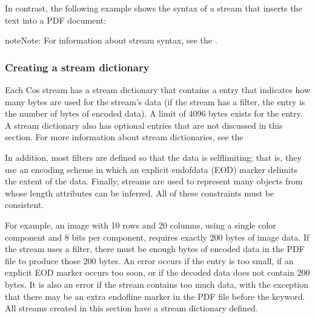 \documentclass[letterpaper,12pt,english,openany,oneside]{sphinxmanual}
\begin{document}
In contrast, the following example shows the syntax of a stream that inserts the text   into a PDF document:

\begin{sphinxVerbatim}[commandchars=\\\{\}]
                      
\end{sphinxVerbatim}

\begin{sphinxadmonition}{note}{Note:}
For information about stream syntax, see the .
\end{sphinxadmonition}


\subsubsection{Creating a stream dictionary}
\label{\detokenize{Plugins_Cos:creating-a-stream-dictionary}}
Each Cos stream has a stream dictionary that contains a  entry that indicates how many bytes are used for the stream’s data (if the stream has a filter, the  entry is the number of bytes of encoded data). A limit of 4096 bytes exists for the  entry. A stream dictionary also has optional entries that are not discussed in this section. For more information about stream dictionaries, see the 

In addition, most filters are defined so that the data is self\sphinxhyphen{}limiting; that is, they use an encoding scheme in which an explicit end\sphinxhyphen{}of\sphinxhyphen{}data (EOD) marker delimits the extent of the data. Finally, streams are used to represent many objects from whose length attributes can be inferred. All of these constraints must be consistent.

For example, an image with 10 rows and 20 columns, using a single color component and 8 bits per component, requires exactly 200 bytes of image data. If the stream uses a filter, there must be enough bytes of encoded data in the PDF file to produce those 200 bytes. An error occurs if the  entry is too small, if an explicit EOD marker occurs too soon, or if the decoded data does not contain 200 bytes. It is also an error if the stream contains too much data, with the exception that there may be an extra end\sphinxhyphen{}of\sphinxhyphen{}line marker in the PDF file before the  keyword. All streams created in this section have a stream dictionary defined.
\end{document}
